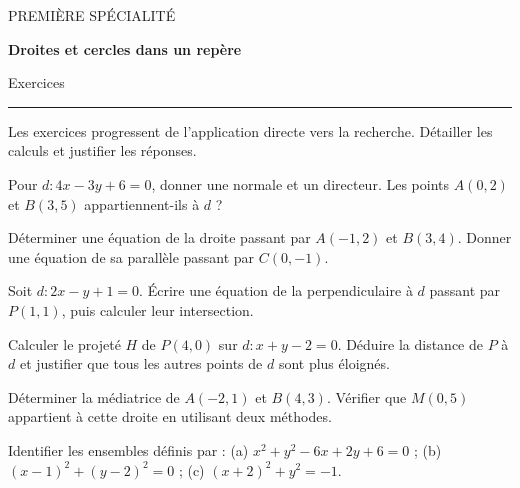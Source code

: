 \documentclass[11pt,a4paper]{article}
\begin{document}
{\small\color{Blue}PREMIÈRE SPÉCIALITÉ}\par{\LARGE\bfseries Droites et cercles dans un repère}\par{\large Exercices}\par\vspace{0.2cm}\hrule\vspace{0.4cm}
Les exercices progressent de l’application directe vers la recherche. Détailler les calculs et justifier les réponses.
\par\noindent\begin{minipage}{\linewidth}
Pour $d:4x-3y+6=0$, donner une normale et un directeur. Les points $A(0,2)$ et $B(3,5)$ appartiennent-ils à $d$ ?
\end{minipage}\par
\par\noindent\begin{minipage}{\linewidth}
Déterminer une équation de la droite passant par $A(-1,2)$ et $B(3,4)$. Donner une équation de sa parallèle passant par $C(0,-1)$.
\end{minipage}\par
\par\noindent\begin{minipage}{\linewidth}
Soit $d:2x-y+1=0$. Écrire une équation de la perpendiculaire à $d$ passant par $P(1,1)$, puis calculer leur intersection.
\end{minipage}\par
\par\noindent\begin{minipage}{\linewidth}
Calculer le projeté $H$ de $P(4,0)$ sur $d:x+y-2=0$. Déduire la distance de $P$ à $d$ et justifier que tous les autres points de $d$ sont plus éloignés.
\end{minipage}\par
\par\noindent\begin{minipage}{\linewidth}
Déterminer la médiatrice de $A(-2,1)$ et $B(4,3)$. Vérifier que $M(0,5)$ appartient à cette droite en utilisant deux méthodes.
\end{minipage}\par
\par\noindent\begin{minipage}{\linewidth}
Identifier les ensembles définis par : (a) $x^2+y^2-6x+2y+6=0$ ; (b) $(x-1)^2+(y-2)^2=0$ ; (c) $(x+2)^2+y^2=-1$.
\end{minipage}\par
\end{document}
